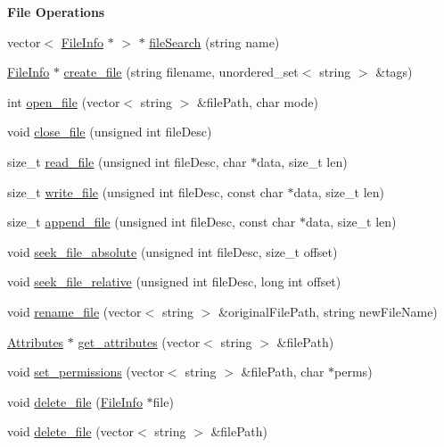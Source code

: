 \begin{Indent}\textbf{ File Operations}\par
\begin{DoxyCompactItemize}
\item 
vector$<$ \mbox{\hyperlink{classFileInfo}{File\+Info}} $\ast$ $>$ $\ast$ \mbox{\hyperlink{classFileSystem_aaa02d1a13bb71582a2a4268d32cba5b6}{file\+Search}} (string name)
\item 
\mbox{\hyperlink{classFileInfo}{File\+Info}} $\ast$ \mbox{\hyperlink{classFileSystem_a2725ca065d28de5650e8368270743614}{create\+\_\+file}} (string filename, unordered\+\_\+set$<$ string $>$ \&tags)
\item 
int \mbox{\hyperlink{classFileSystem_a661ae7deb6fb32cdd7d631dfadb8c983}{open\+\_\+file}} (vector$<$ string $>$ \&file\+Path, char mode)
\item 
void \mbox{\hyperlink{classFileSystem_ac4e7222e78b352ed442f2cfd99d46a98}{close\+\_\+file}} (unsigned int file\+Desc)
\item 
size\+\_\+t \mbox{\hyperlink{classFileSystem_aa8bf729b0bad79a4c2fda24c2d1def7f}{read\+\_\+file}} (unsigned int file\+Desc, char $\ast$data, size\+\_\+t len)
\item 
size\+\_\+t \mbox{\hyperlink{classFileSystem_ad8658ccba0a17c3e9b22d05aeb498c99}{write\+\_\+file}} (unsigned int file\+Desc, const char $\ast$data, size\+\_\+t len)
\item 
size\+\_\+t \mbox{\hyperlink{classFileSystem_a3362c6b1cabc3497ac41542e94837e4a}{append\+\_\+file}} (unsigned int file\+Desc, const char $\ast$data, size\+\_\+t len)
\item 
void \mbox{\hyperlink{classFileSystem_af2d28b0d03e0595b686be6bc0e3e22b5}{seek\+\_\+file\+\_\+absolute}} (unsigned int file\+Desc, size\+\_\+t offset)
\item 
void \mbox{\hyperlink{classFileSystem_aee77ad983da8db9fe2de0c13b91fe977}{seek\+\_\+file\+\_\+relative}} (unsigned int file\+Desc, long int offset)
\item 
void \mbox{\hyperlink{classFileSystem_a466ab4fcc5f4aeba5131c8700e006d4c}{rename\+\_\+file}} (vector$<$ string $>$ \&original\+File\+Path, string new\+File\+Name)
\item 
\mbox{\hyperlink{classAttributes}{Attributes}} $\ast$ \mbox{\hyperlink{classFileSystem_a32588895aea79931d4a09deb89ec2659}{get\+\_\+attributes}} (vector$<$ string $>$ \&file\+Path)
\item 
void \mbox{\hyperlink{classFileSystem_abfa7e15fdbeaaaabfa3a542625c90b83}{set\+\_\+permissions}} (vector$<$ string $>$ \&file\+Path, char $\ast$perms)
\item 
void \mbox{\hyperlink{classFileSystem_a2718456ead4a9e7244c33d4a86cb844c}{delete\+\_\+file}} (\mbox{\hyperlink{classFileInfo}{File\+Info}} $\ast$file)
\item 
void \mbox{\hyperlink{classFileSystem_a5620f645c0e25ade03f14ae81432654c}{delete\+\_\+file}} (vector$<$ string $>$ \&file\+Path)
\end{DoxyCompactItemize}
\end{Indent}
